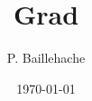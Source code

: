 \documentclass[12pt, a4paper]{article}
\begin{document}
\title{Grad}
\author{P. Baillehache}
\date{\today}
\maketitle

\tableofcontents


\end{document}

